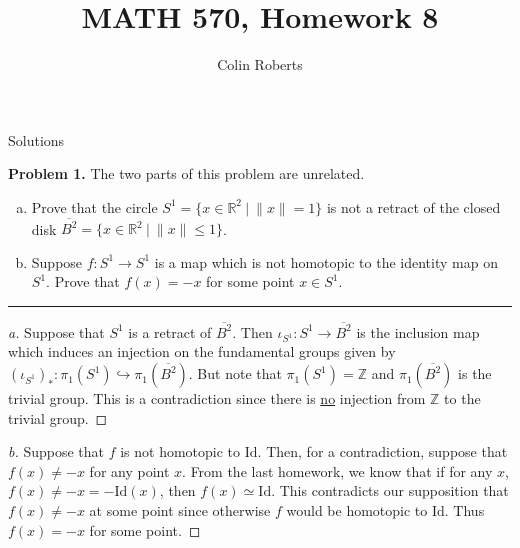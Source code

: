 \documentclass[leqno]{article}
\author{Colin Roberts}
\title{MATH 570, Homework 8}
\theoremstyle{nonumberplain}
\newtheorem{proof}{Proof}
\newcommand{\R}{\ensuremath{\mathbb{R}}}
\begin{document}
\maketitle
\begin{large}
\begin{center}
Solutions
\end{center}
\end{large}
\pagebreak


\noindent\textbf{Problem 1.}  The two parts of this problem are unrelated.
\begin{enumerate}[(a)]
\item Prove that the circle $S^1 = \{x\in \R^2 ~\vert~ \|x\|=1\}$ is not a retract of the closed disk $\overline{B^2} = \{x\in \R^2 ~\vert~ \|x\|\leq 1\}$.

\item Suppose $f\colon S^1 \to S^1$ is a map which is not homotopic to the identity map on $S^1$. Prove that $f(x)=-x$ for some point $x\in S^1$.
\end{enumerate}

\noindent\rule[0.5ex]{\linewidth}{1pt}

\begin{proof}[a]
Suppose that $S^1$ is a retract of $\overline{B^2}$.  Then $\iota_{S^1} \colon S^1 \to \overline{B^2}$ is the inclusion map which induces an injection on the fundamental groups given by $(\iota_{S^1})_* \colon \pi_1(S^1) \hookrightarrow \pi_1(\overline{B^2})$.  But note that $\pi_1(S^1)=\mathbb{Z}$ and $\pi_1(\overline{B^2})$ is the trivial group.  This is a contradiction since there is \underline{no} injection from $\mathbb{Z}$ to the trivial group.
\end{proof}

\begin{proof}[b]
Suppose that $f$ is not homotopic to $\mathrm{Id}$. Then, for a contradiction, suppose that $f(x)\neq -x$ for any point $x$.  From the last homework, we know that if for any $x$, $f(x)\neq -x = - \mathrm{Id} (x)$, then $f(x)\simeq \mathrm{Id}$.  This contradicts our supposition that $f(x)\neq -x$ at some point since otherwise $f$ would be homotopic to $\mathrm{Id}$.  Thus $f(x)=-x$ for some point.
\end{proof}
\end{document}
